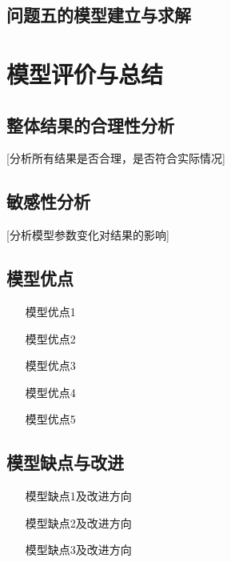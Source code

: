 \documentclass[fontset=SimSun]{ctexart}
\begin{document}
\subsection{问题五的模型建立与求解}


\section{模型评价与总结}

\subsection{整体结果的合理性分析}
[分析所有结果是否合理，是否符合实际情况]

\subsection{敏感性分析}
[分析模型参数变化对结果的影响]

\subsection{模型优点}

\begin{itemize}[leftmargin=2.5cm]
    \item [模型优点1]
    \item [模型优点2]
    \item [模型优点3]
    \item [模型优点4]
    \item [模型优点5]
\end{itemize}

\subsection{模型缺点与改进}

\begin{itemize}[leftmargin=2.5cm]
    \item [模型缺点1及改进方向]
    \item [模型缺点2及改进方向]
    \item [模型缺点3及改进方向]
\end{itemize}

\newpage
\appendix
\end{document}
